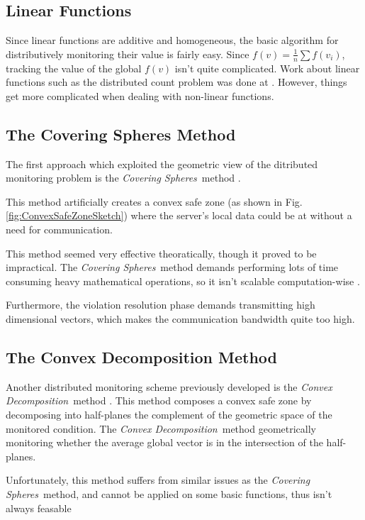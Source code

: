 \documentclass[11pt, conference]{article}
\newcommand{\coveringSpheres}{\textit{Covering Spheres}}
\newcommand{\convexDecomposition}{\textit{Convex Decomposition}}
\begin{document}
\subsection{Linear Functions}

Since linear functions are additive and homogeneous, the basic algorithm for distributively monitoring their value is fairly easy. Since ${f(v) = \frac{1}{n}\sum f(v_i)}$, tracking the value of the global $f(v)$ isn't quite complicated. Work about linear functions such as the distributed count problem was done at \cite{keralapura2006communication}. However, things get more complicated when dealing with non-linear functions.

\subsection{The Covering Spheres Method}

The first approach which exploited the geometric view of the ditributed monitoring problem is the \coveringSpheres \ method \cite{sharfman2007geometric}.

This method artificially creates a convex safe zone (as shown in Fig. \ref{fig:ConvexSafeZoneSketch}) where the server's local data could be at without a need for communication.

This method seemed very effective theoratically, though it proved to be impractical. The \coveringSpheres \ method demands performing lots of time consuming heavy mathematical operations, so it isn't scalable computation-wise \cite{lazerson2018lightweight}.

Furthermore, the violation resolution phase demands transmitting high dimensional vectors, which makes the communication bandwidth quite too high.

\subsection{The Convex Decomposition Method}

Another distributed monitoring scheme previously developed is the \convexDecomposition \ method \cite{lazerson2015monitoring}. This method composes a convex safe zone by decomposing into half-planes the complement of the geometric space of the monitored condition. The \convexDecomposition \ method geometrically monitoring whether the average global vector is in the intersection of the half-planes.

Unfortunately, this method suffers from similar issues as the \coveringSpheres \ method, and cannot be applied on some basic functions, thus isn't always feasable \cite{lazerson2018lightweight}
\end{document}
